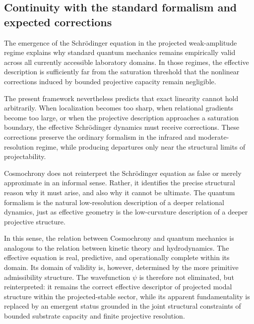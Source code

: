 \subsection{Continuity with the standard formalism and expected corrections}
  \label{subsec:continuity-with-standard-formalism}

  The emergence of the Schr\"{o}dinger equation in the projected weak-amplitude regime
  explains why standard quantum mechanics remains empirically valid across all currently
  accessible laboratory domains.
  In those regimes, the effective description is sufficiently far from the saturation threshold
  that the nonlinear corrections induced by bounded projective capacity remain negligible.

  The present framework nevertheless predicts that exact linearity cannot hold arbitrarily.
  When localization becomes too sharp, when relational gradients become too large, or when
  the projective description approaches a saturation boundary, the effective Schr\"{o}dinger
  dynamics must receive corrections.
  These corrections preserve the ordinary formalism in the infrared and moderate-resolution
  regime, while producing departures only near the structural limits of projectability.

  Cosmochrony does not reinterpret the Schr\"{o}dinger equation as false or merely
  approximate in an informal sense.
  Rather, it identifies the precise structural reason why it must arise, and also why it cannot
  be ultimate.
  The quantum formalism is the natural low-resolution description of a deeper relational
  dynamics, just as effective geometry is the low-curvature description of a deeper projective
  structure.

  In this sense, the relation between Cosmochrony and quantum mechanics is analogous to
  the relation between kinetic theory and hydrodynamics.
  The effective equation is real, predictive, and operationally complete within its domain.
  Its domain of validity is, however, determined by the more primitive
  admissibility structure.
  The wavefunction $\psi$ is therefore not eliminated, but reinterpreted:
  it remains the correct effective descriptor of projected modal structure within the
  projected-stable sector, while its apparent fundamentality is replaced by an emergent
  status grounded in the joint structural constraints of bounded substrate capacity and
  finite projective resolution.
